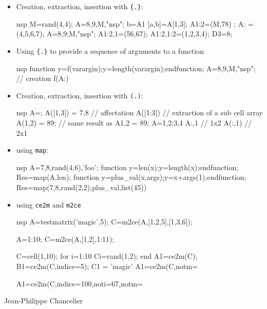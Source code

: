 \begin{examples}
\begin{itemize}
\item Creation, extraction, insertion with \verb+{.}+:
\begin{mintednsp}{nsp}
  M=rand(4,4);
  A={8,9,M,"nsp"};  
  b=A{1} 	
  [a,b]=A{[1,3]};
  A{1:2}=(M,78) ; 
  A{:} = (4,5,6,7); 
  A={8,9;M,"nsp"};  
  A{1:2,1}=(56,67);
  A{1:2,1:2}=(1,2,3,4);
  D{3}=8;
\end{mintednsp}

\item Using \verb+{.}+ to provide a sequence of arguments to a function
\begin{mintednsp}{nsp} 
  function y=f(varargin);y=length(varargin);endfunction;
  A={8,9,M,"nsp"}; // creation 
  f(A{:})
\end{mintednsp}
\item Creation, extraction, insertion with \verb+(.)+:
\begin{mintednsp}{nsp}
  A={}; 
  A([1,3]) = {7,8} // affectation 
  A([1:3]) // extraction of a sub cell array
  A(1,2) = {89};  // same result as A{1,2} = 89;
  A={1,2;3,4}
  { A{:,1}}   // 1x2 
  A(:,1)      // 2x1 
\end{mintednsp}

\item using \verb+map+:
\begin{mintednsp}{nsp}
  A={7,8,rand(4,6),'foo'}; 
  function y=len(x);y=length(x);endfunction;
  Res=map(A,len);
  function y=plus_val(x,args);y=x+args(1);endfunction;
  Res=map({7,8,rand(2,2)},plus_val,list(45))
\end{mintednsp}

\item using \verb!ce2m! and \verb!m2ce!

\begin{mintednsp}{nsp}
  A=testmatrix('magic',5);
  C=m2ce(A,[1,2,5],[1,3,6]);

  A=1:10;
  C=m2ce(A,[1,2],1:11);
  
  C=cell(1,10);
  for i=1:10 
    C{i}=rand(1,2);
  end 
  A1=ce2m(C);
  B1=ce2m(C,indice=5); 
  C{1} = 'magic'
  A1=ce2m(C,notm=%
  
  A1=ce2m(C,indice=100,noti=67,notm=%
\end{mintednsp}

\end{itemize}

\end{examples}

\begin{authors}
  Jean-Philippe Chancelier
\end{authors}





